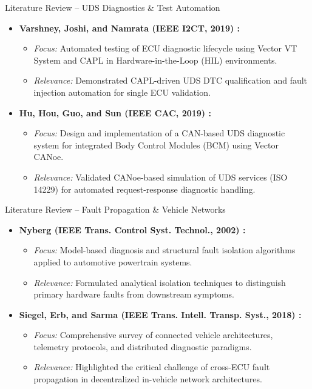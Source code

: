 \documentclass[aspectratio=169, 10pt]{beamer}
\begin{document}
\begin{frame}{Literature Review -- UDS Diagnostics \& Test Automation}
  \begin{itemize}
    \item \textbf{Varshney, Joshi, and Namrata (IEEE I2CT, 2019) \cite{varshney2019}:}
    \begin{itemize}
      \item \textit{Focus:} Automated testing of ECU diagnostic lifecycle using Vector VT System and CAPL in Hardware-in-the-Loop (HIL) environments.
      \item \textit{Relevance:} Demonstrated CAPL-driven UDS DTC qualification and fault injection automation for single ECU validation.
    \end{itemize}
    \vspace{0.3cm}
    \item \textbf{Hu, Hou, Guo, and Sun (IEEE CAC, 2019) \cite{hu2019}:}
    \begin{itemize}
      \item \textit{Focus:} Design and implementation of a CAN-based UDS diagnostic system for integrated Body Control Modules (BCM) using Vector CANoe.
      \item \textit{Relevance:} Validated CANoe-based simulation of UDS services (ISO 14229) for automated request-response diagnostic handling.
    \end{itemize}
  \end{itemize}
\end{frame}

\begin{frame}{Literature Review -- Fault Propagation \& Vehicle Networks}
  \begin{itemize}
    \item \textbf{Nyberg (IEEE Trans. Control Syst. Technol., 2002) \cite{nyberg2002}:}
    \begin{itemize}
      \item \textit{Focus:} Model-based diagnosis and structural fault isolation algorithms applied to automotive powertrain systems.
      \item \textit{Relevance:} Formulated analytical isolation techniques to distinguish primary hardware faults from downstream symptoms.
    \end{itemize}
    \vspace{0.3cm}
    \item \textbf{Siegel, Erb, and Sarma (IEEE Trans. Intell. Transp. Syst., 2018) \cite{siegel2018}:}
    \begin{itemize}
      \item \textit{Focus:} Comprehensive survey of connected vehicle architectures, telemetry protocols, and distributed diagnostic paradigms.
      \item \textit{Relevance:} Highlighted the critical challenge of cross-ECU fault propagation in decentralized in-vehicle network architectures.
    \end{itemize}
  \end{itemize}
\end{frame}
\end{document}

